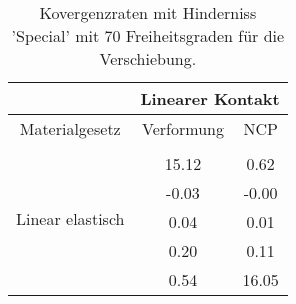 \begin{table} 
\centering 
\begin{tabular}{c|cc|} 
\cline{2-3} 
 & \multicolumn{2}{|c|}{Linearer Kontakt} \\ 
\hline 
\multicolumn{1}{|c|}{Materialgesetz} & \multicolumn{1}{c|}{Verformung} & \multicolumn{1}{c|}{NCP} \\ 
\hline 
\multicolumn{1}{|c|}{\multirow{6}{*}{Linear elastisch}} &\multicolumn{1}{|c|}{} & \multicolumn{1}{|c|}{} \\ 
\multicolumn{1}{|c|}{} & \multicolumn{1}{|c|}{     15.12} & \multicolumn{1}{|c|}{      0.62} \\ 
\multicolumn{1}{|c|}{} & \multicolumn{1}{|c|}{     -0.03} & \multicolumn{1}{|c|}{     -0.00} \\ 
\multicolumn{1}{|c|}{} & \multicolumn{1}{|c|}{      0.04} & \multicolumn{1}{|c|}{      0.01} \\ 
\multicolumn{1}{|c|}{} & \multicolumn{1}{|c|}{      0.20} & \multicolumn{1}{|c|}{      0.11} \\ 
\multicolumn{1}{|c|}{} & \multicolumn{1}{|c|}{      0.54} & \multicolumn{1}{|c|}{     16.05} \\ 
\hline 
\end{tabular}\caption{Kovergenzraten mit Hinderniss 'Special' mit 70 Freiheitsgraden für die Verschiebung.}\label{tab:Rate_Special_level1}
\end{table} 
